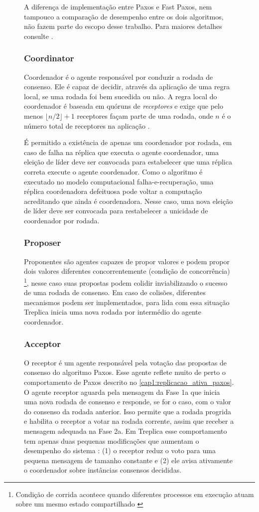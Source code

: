 \begin{figure}[ht]
A diferença de implementação entre Paxos e Fast Paxos, nem tampouco a comparação de
desempenho entre os dois algoritmos, não fazem parte do escopo desse trabalho. Para
maiores detalhes consulte \cite{vieira09}.

\subsubsection{Coordinator}

Coordenador é o agente responsável por conduzir a rodada de consenso. Ele é capaz de
decidir, através da aplicação de uma regra local, se uma rodada foi bem sucedida ou não. A
regra local do coordenador é baseada em quóruns de \emph{receptores} e exige que pelo
menos $\lfloor n/2 \rfloor + 1$ receptores façam parte de uma rodada, onde $n$ é o número
total de receptores na aplicação \cite{lamport98}.

É permitido a existência de apenas um coordenador por rodada, em caso de falha na réplica
que executa o agente coordenador, uma eleição de líder deve ser convocada para estabelecer
que uma réplica correta execute o agente coordenador. Como o algoritmo é executado no
modelo computacional falha-e-recuperação, uma réplica coordenadora defeituosa pode voltar
a computação acreditando que ainda é coordenadora. Nesse caso, uma nova eleição de líder
deve ser convocada para restabelecer a unicidade de coordenador por rodada.

\subsubsection{Proposer}

Proponentes são agentes capazes de propor valores e podem propor dois valores diferentes
concorrentemente (condição de concorrência) \footnote{Condição de corrida acontece quando
diferentes processos em execução atuam sobre um mesmo estado compartilhado
\cite{goetz06}}, nesse caso suas propostas podem colidir inviabilizando o sucesso de uma
rodada de consenso. Em caso de colisões, diferentes mecanismos podem ser implementados,
para lida com essa situação Treplica inicia uma nova rodada por intermédio do agente
coordenador.

\subsubsection{Acceptor}

O receptor é um agente responsável pela votação das propostas de consenso do algoritmo
Paxos. Esse agente reflete muito de perto o comportamento de Paxos descrito no
\autoref{cap1:replicacao_ativa_paxos}. O agente receptor aguarda pela mensagem da Fase 1a
que inicia uma nova rodada de consenso e responde, se for o caso, com o valor do consenso
da rodada anterior. Isso permite que a rodada progrida e habilita o receptor a votar na
rodada corrente, assim que receber a mensagem adequada na Fase 2a. Em Treplica esse
comportamento tem apenas duas pequenas modificações que aumentam o desempenho do sistema
\cite{vieira-tr10b}: (1) o receptor reduz o voto para uma pequena mensagem de tamanho
constante e (2) ele avisa ativamente o coordenador sobre instâncias consensos decididas.


\end{figure}
